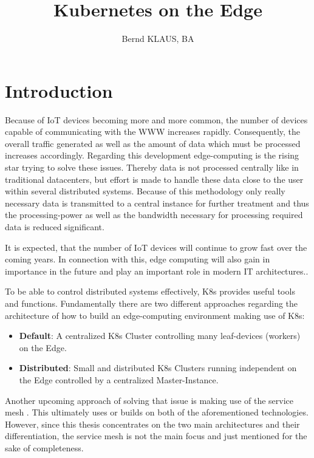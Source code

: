 \documentclass[MIC,Master,english]{twbook}%
\title{Kubernetes on the Edge}
\author{Bernd KLAUS, BA}
\begin{document}
\maketitle
\chapter{Introduction}
\label{chap:introduction}
Because of \ac{IoT} devices becoming more and more common, the number of devices capable of communicating with the \ac{WWW} increases rapidly. Consequently, the overall traffic generated as well as the amount of data which must be processed increases accordingly. Regarding this development edge-computing is the rising star trying to solve these issues. Thereby data is not processed centrally like in traditional datacenters, but effort is made to handle these data close to the user within several distributed systems. Because of this methodology only really necessary data is transmitted to a central instance for further treatment and thus the processing-power as well as the bandwidth necessary for processing required data is reduced significant. 
\par It is expected, that the number of IoT devices will continue to grow fast \cite{SotE21} over the coming years. In connection with this, edge computing will also gain in importance in the future and play an important role in modern \ac{IT} architectures.. 
\par To be able to control distributed systems effectively, \ac{K8s} provides useful tools and functions. Fundamentally there are two different approaches regarding the architecture of how to build an edge-computing environment making use of \ac{K8s}:

\begin{itemize}
    \label{item:architecture}
    \item \textbf{Default}: A centralized \ac{K8s} Cluster controlling many leaf-devices (workers) on the Edge.
    \item \textbf{Distributed}: Small and distributed \ac{K8s} Clusters running independent on the Edge controlled by a centralized Master-Instance.
\end{itemize}

Another upcoming approach of solving that issue is making use of the service mesh \cite{servicemesh}. This ultimately uses or builds on both of the aforementioned technologies. However, since this thesis concentrates on the two main architectures and their differentiation, the service mesh is not the main focus and just mentioned for the sake of completeness.
\end{document}
